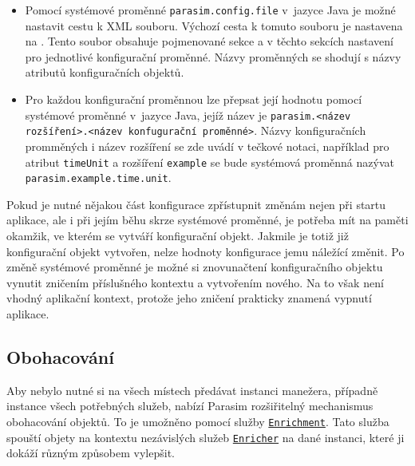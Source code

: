 \begin{itemize}
	\item	Pomocí systémové proměnné \texttt{parasim.config.file} v~jazyce Java je mož\-né nastavit cestu k XML souboru.
			Výchozí cesta k tomuto souboru je nastavena na . Tento soubor
			obsahuje pojmenované sekce a v těchto sekcích nastavení pro jednotlivé konfigurační
			pro\-měn\-né. Názvy proměnných se shodují s názvy atributů kon\-fi\-gu\-rač\-ních objektů.

	\item	Pro každou konfigurační proměnnou lze přepsat její hodnotu po\-mo\-cí systémové
			proměnné v~jazyce Java, jejíž název je \texttt{parasim.<název roz\-ší\-ření>.<název konfugurační proměnné>}.
			Názvy kon\-fi\-gu\-rač\-ních promměných i název rozšíření se zde uvádí v tečkové notaci, například pro atribut \texttt{timeUnit}
			a rozšíření \texttt{example} se bude sys\-té\-mo\-vá proměnná nazývat \texttt{parasim.example.time.unit}.
\end{itemize}

Pokud je nutné nějakou část konfigurace zpřístupnit
změnám nejen při startu aplikace, ale i při jejím běhu skrze systémové proměnné, je potřeba mít na paměti
okamžik, ve kterém se vytváří konfigurační objekt. Jakmile je totiž již konfigurační objekt vytvořen,
nelze hodnoty konfigurace jemu náležící změnit. Po změně systémové proměnné
je možné si znovunačtení konfiguračního objektu vynutit zničením příslušného kontextu
a vy\-tvo\-ře\-ním nového. Na to však není vhodný aplikační kontext, protože jeho
zničení prakticky znamená vypnutí aplikace.

\subsection{Obohacování}\label{section:enrichment}

Aby nebylo nutné si na všech místech předávat instanci manežera, případně instance všech
potřebných služeb, nabízí Parasim rozšiřitelný mechanismus obohacování objektů.
To je umožněno pomocí služby \href{https://github.com/sybila/parasim/blob/2.0.0.Final/core/src/main/java/org/sybila/parasim/core/api/enrichment/Enrichment.java}{\texttt{Enrichment}}.
Tato služba spouští objety na kontextu nezávislých služeb \href{https://github.com/sybila/parasim/blob/2.0.0.Final/core/src/main/java/org/sybila/parasim/core/spi/enrichment/Enricher.java}{\texttt{Enricher}}
na dané instanci, které ji dokáží různým způsobem vylepšit. 

